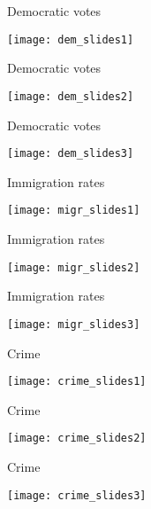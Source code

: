 \documentclass[xcolor=pdftex,dvipsnames,table]{beamer}
\begin{document}
\begin{frame}{Democratic votes}
\begin{center}
\texttt{[image: dem\_slides1]}
\end{center}
\end{frame}

\begin{frame}{Democratic votes}
\begin{center}
\texttt{[image: dem\_slides2]}
\end{center}
\end{frame}

\begin{frame}{Democratic votes}
\begin{center}
\texttt{[image: dem\_slides3]}
\end{center}
\end{frame}

\begin{frame}{Immigration rates}
\begin{center}
\texttt{[image: migr\_slides1]}
\end{center}
\end{frame}

\begin{frame}{Immigration rates}
\begin{center}
\texttt{[image: migr\_slides2]}
\end{center}
\end{frame}

\begin{frame}{Immigration rates}
\begin{center}
\texttt{[image: migr\_slides3]}
\end{center}
\end{frame}

\begin{frame}{Crime}
\begin{center}
\texttt{[image: crime\_slides1]}
\end{center}
\end{frame}

\begin{frame}{Crime}
\begin{center}
\texttt{[image: crime\_slides2]}
\end{center}
\end{frame}

\begin{frame}{Crime}
\begin{center}
\texttt{[image: crime\_slides3]}
\end{center}
\end{frame}
\end{document}
